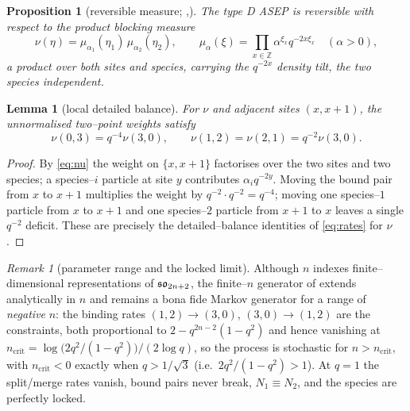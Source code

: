 \documentclass[11pt]{article}
\theoremstyle{plain}
\newtheorem{proposition}[theorem]{Proposition}
\newtheorem{lemma}[theorem]{Lemma}
\theoremstyle{definition}
\theoremstyle{remark}
\newtheorem{remark}[theorem]{Remark}
\newcommand{\Z}{\mathbb{Z}}\newcommand{\R}{\mathbb{R}}\newcommand{\N}{\mathbb{N}}
\begin{document}
\begin{proposition}[reversible measure; {\cite[Prop.~1.3]{KLLPZ}},{\cite[\S3.1]{REU}}]
\label{prop:measure}
The type D ASEP is reversible with respect to the product blocking measure
\begin{equation}\label{eq:nu}
  \nu(\eta)=\mu_{\alpha_1}(\eta_1)\,\mu_{\alpha_2}(\eta_2),\qquad
  \mu_\alpha(\xi)=\prod_{x\in\Z}\alpha^{\xi_x}q^{-2x\xi_x}\quad(\alpha>0),
\end{equation}
a product over both sites and species, carrying the $q^{-2x}$ density tilt, the two
species independent.
\end{proposition}

\begin{lemma}[local detailed balance]\label{lem:db}
For $\nu$ and adjacent sites $(x,x+1)$, the unnormalised two--point weights satisfy
\begin{equation}\label{eq:dbrel}
  \nu(0,3)=q^{-4}\nu(3,0),\qquad \nu(1,2)=\nu(2,1)=q^{-2}\nu(3,0).
\end{equation}
\end{lemma}
\begin{proof}
By \eqref{eq:nu} the weight on $\{x,x+1\}$ factorises over the two sites and two
species; a species--$i$ particle at site $y$ contributes $\alpha_i q^{-2y}$. Moving the
bound pair from $x$ to $x+1$ multiplies the weight by $q^{-2}\cdot q^{-2}=q^{-4}$;
moving one species--$1$ particle from $x$ to $x+1$ and one species--$2$ particle from
$x+1$ to $x$ leaves a single $q^{-2}$ deficit. These are precisely the
detailed--balance identities of \eqref{eq:rates} for $\nu$.
\end{proof}

\begin{remark}[parameter range and the locked limit]\label{rem:range}
Although $n$ indexes finite--dimensional representations of $\mathfrak{so}_{2n+2}$, the
finite--$n$ generator of \cite[\S2.1]{REU} extends analytically in $n$ and remains a
bona fide Markov generator for a range of \emph{negative} $n$: the binding rates
$(1,2)\to(3,0)$, $(3,0)\to(1,2)$ are the constraints, both proportional to
$2-q^{2n-2}(1-q^2)$ and hence vanishing at
$n_{\mathrm{crit}}=\log\!\big(2q^2/(1-q^2)\big)/(2\log q)$, so the process is stochastic
for $n>n_{\mathrm{crit}}$, with $n_{\mathrm{crit}}<0$ exactly when $q>1/\sqrt3$ (i.e.\
$2q^2/(1-q^2)>1$). At
$q=1$ the split/merge rates vanish, bound pairs never break, $N_1\equiv N_2$, and the
species are perfectly locked.
\end{remark}
\end{document}

